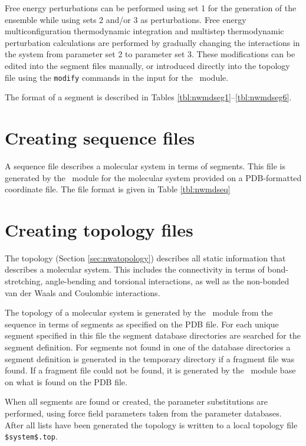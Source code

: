 Free energy perturbations can be performed using set 1 for the 
generation of the ensemble while using sets 2 and/or 3
as perturbations. Free energy multiconfiguration thermodynamic
integration and multistep thermodynamic perturbation calculations are
performed by gradually changing the interactions in the system from
parameter set 2 to parameter set 3. These modifications can be 
edited into the segment files manually, or introduced directly into
the topology file using the \verb+modify+ commands in the input for
the \prepare\ module.

The format of a segment is
described in Tables \ref{tbl:nwmdseg1}--\ref{tbl:nwmdseg6}.

\section{Creating sequence files}
A sequence file describes a molecular system in terms of segments. This
file is generated by the \prepare\ module for the molecular system
provided on a PDB-formatted coordinate file.
The file format is given in Table \ref{tbl:nwmdseq}

\section{Creating topology files}
\label{sec:nwanwtop}

The topology (Section \ref{sec:nwatopology}) describes all static information
that describes a molecular system. This includes the connectivity in
terms of bond-stretching, angle-bending and torsional interactions, as well as
the non-bonded van der Waals and Coulombic interactions.

The topology of a molecular system is generated by the \prepare\ module
from the sequence in terms of segments as specified on the PDB file.
For each unique segment specified in this file the 
segment database directories are searched for the segment definition. 
For segments not found in one of the database directories a segment definition
is generated in the temporary directory if a fragment file was found.
If a fragment file could not be found, it is generated by the \prepare\ module
base on what is found on the PDB file.

When all segments are found or created, the parameter substitutions are 
performed, using force field parameters taken from the parameter 
databases. After all lists have been generated the
topology is written to a local topology file \verb+$system$.top+.

